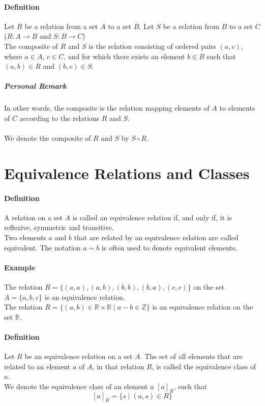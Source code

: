 \documentclass[10pt,a4paper]{book}
\newcommand{\R}{\mathbb{R}}
\begin{document}
\paragraph*{Definition}
$\ $\\
\hspace*{\parindent}Let $R$ be a relation from a set $A$ to a set $B$. Let $S$ be a relation from $B$ to a set $C$ ($R : A \to B$ and $S : B \to C$)\\
\hspace*{\parindent}The composite of $R$ and $S$ is the relation consisting of ordered pairs $(a,c)$, where $a \in A$, $c \in C$, and for which there exists an element $b \in B$ such that $(a,b) \in R$ and $(b,c) \in S$.
\subparagraph*{Personal Remark}
In other words, the composite is the relation mapping elements of $A$ to elements of $C$ according to the relations $R$ and $S$.\\
\\
We denote the composite of $R$ and $S$ by $S \circ R$.

\section{Equivalence Relations and Classes}
\paragraph*{Definition}
$\ $\\
\hspace*{\parindent}A relation on a set $A$ is called an equivalence relation if, and only if, it is reflexive, symmetric and transitive.\\
\hspace*{\parindent}Two elements $a$ and $b$ that are related by an equivalence relation are called equivalent. The notation $a \sim b$ is often used to denote equivalent elements.
\paragraph*{Example}
The relation $R = \{(a,a),(a,b),(b,b),(b,a),(c,c)\}$ on the set $A = \{a,b,c\}$ is an equivalence relation.\\
\hspace*{\parindent}The relation $R = \{(a,b) \in \R \times \R \mid a - b \in \mathbb{Z}\}$ is an equivalence relation on the set $\mathbb{R}$.
\paragraph*{Definition}
$\ $\\
\hspace*{\parindent}Let $R$ be an equivalence relation on a set $A$. The set of all elements that are related to an element $a$ of $A$, in that relation $R$, is called the equivalence class of $a$.\\
\hspace*{\parindent}We denote the equivalence class of an element $a$  $[a]_R$, such that \[[a]_R = \{s \mid (a,s) \in R\}\]
\end{document}
